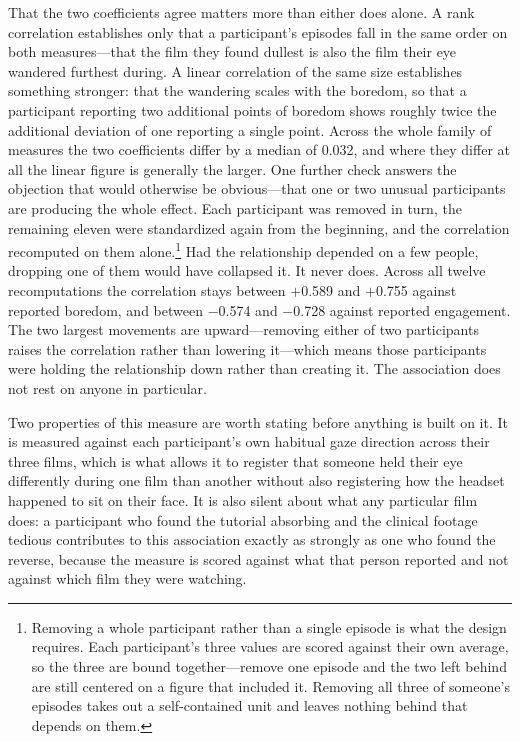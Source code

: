 That the two coefficients agree matters more than either does alone. A rank correlation
establishes only that a participant's episodes fall in the same order on both measures---that
the film they found dullest is also the film their eye wandered furthest during. A linear
correlation of the same size establishes something stronger: that the wandering scales with the
boredom, so that a participant reporting two additional points of boredom shows roughly twice
the additional deviation of one reporting a single point. Across the whole family of measures
the two coefficients differ by a median of 0.032, and where they differ at all the linear
figure is generally the larger. One further check answers the objection that would otherwise be
obvious---that one or two unusual participants are producing the whole effect. Each participant
was removed in turn, the remaining eleven were standardized again from the beginning, and the
correlation recomputed on them alone.\footnote{Removing a whole participant rather than a single
episode is what the design requires. Each participant's three values are scored against their own
average, so the three are bound together---remove one episode and the two left behind are still
centered on a figure that included it. Removing all three of someone's episodes takes out a
self-contained unit and leaves nothing behind that depends on them.} Had the relationship
depended on a few people, dropping one of them would have collapsed it. It never does. Across
all twelve recomputations the correlation stays between $+$0.589 and $+$0.755 against reported
boredom, and between $-$0.574 and $-$0.728 against reported engagement. The two largest movements
are upward---removing either of two participants raises the correlation rather than lowering
it---which means those participants were holding the relationship down rather than creating it.
The association does not rest on anyone in particular.

Two properties of this measure are worth stating before anything is built on it. It is measured
against each participant's own habitual gaze direction across their three films, which is what
allows it to register that someone held their eye differently during one film than another
without also registering how the headset happened to sit on their face. It is also silent about
what any particular film does: a participant who found the tutorial absorbing and the clinical
footage tedious contributes to this association exactly as strongly as one who found the
reverse, because the measure is scored against what that person reported and not against which
film they were watching.

